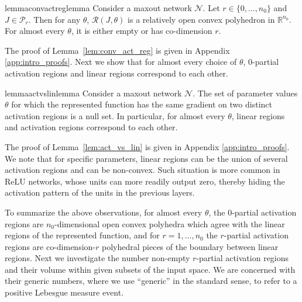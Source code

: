 \documentclass{article}
\theoremstyle{definition}
\newcommand{\net}{\mathcal{N}}
\newcommand{\nin}{n_0}
\begin{document}
\begin{restatable}{lemma}{convactreglemma}
    \label{lem:conv_act_reg}
    Consider a maxout network $\net$. Let $r \in \{0, \dots, \nin \}$ and $J\in\mathcal{P}_r$.
    Then for any $\theta$, $\mathcal{R}(J,\theta)$ is a relatively open convex polyhedron in $\mathbb{R}^{\nin}$. 
    For almost every $\theta$, it is either empty or has co-dimension $r$. 
\end{restatable}
The proof of Lemma~\ref{lem:conv_act_reg} is given in Appendix \ref{app:intro_proofs}. 
Next we show that for almost every choice of $\theta$, 
$0$-partial activation regions and linear regions correspond to each other.

\begin{restatable}{lemma}{actvslinlemma}
    \label{lem:act_vs_lin}
    Consider a maxout network $\net$. 
    The set of parameter values $\theta$ for which the represented function has the same gradient on two distinct activation regions is a null set.
    In particular, for almost every $\theta$,
    linear regions and activation regions correspond to each other.
\end{restatable}
The proof of Lemma~\ref{lem:act_vs_lin} is given in Appendix \ref{app:intro_proofs}. 
We note that for specific parameters, linear regions can be the union of several activation regions and can be non-convex. 
Such situation is more common in ReLU networks, whose units can more readily output zero, thereby hiding the activation pattern of the units in the previous layers. 

To summarize the above observations, for almost every $\theta$, the $0$-partial activation regions are $\nin$-dimensional open convex polyhedra which agree with the linear regions of the represented function, and for $r=1,\ldots,\nin$ the $r$-partial activation regions are co-dimension-$r$ polyhedral pieces of the boundary between linear regions.
Next we investigate the number non-empty $r$-partial activation regions and their volume within given subsets of the input space. 
We are concerned with their generic numbers, where we use ``generic'' in the standard sense, to refer to a positive Lebesgue measure event.

\end{document}
